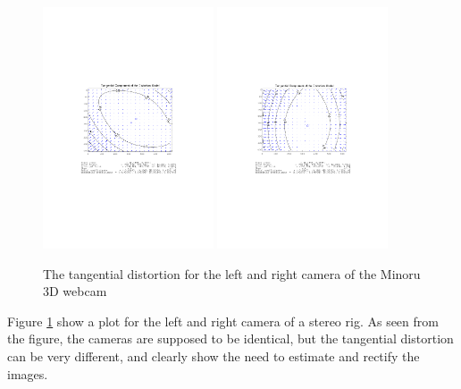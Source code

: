 \begin{figure}[htbp]
    \centering
    \includegraphics[width=0.45\textwidth]{pics/left_tang_dist}
    \includegraphics[width=0.45\textwidth]{pics/right_tang_dist}
    \caption{The tangential distortion for the left and right camera of the Minoru 3D
    webcam}
    \label{chap2:fig-tang-dist}
\end{figure}
Figure \ref{chap2:fig-tang-dist} show a plot for the left and right camera of a stereo
rig. As seen from the figure, the cameras are supposed to be identical, but the tangential
distortion can be very different, and clearly show the need to estimate and rectify the
images. 


